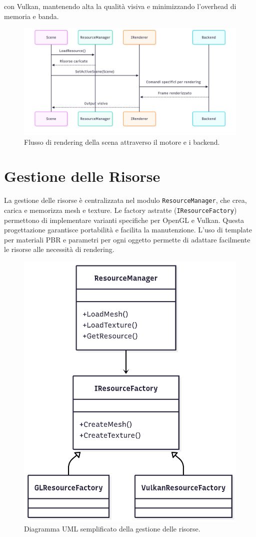 \documentclass[12pt,a4paper,openright,twoside]{book}
\begin{document}
con Vulkan, mantenendo alta la qualità visiva e minimizzando l'overhead di memoria e banda.
\begin{figure}[H]
    \centering
    \includegraphics[width=.8\linewidth]{figures/uml_activity_rendering.png}
    \caption{Flusso di rendering della scena attraverso il motore e i backend.}
    \label{fig:uml-activity-rendering}
\end{figure}

\section{Gestione delle Risorse}
La gestione delle risorse è centralizzata nel modulo \texttt{ResourceManager}, che crea, carica e memorizza mesh e
texture. Le factory astratte (\texttt{IResourceFactory}) permettono di implementare varianti specifiche per OpenGL e Vulkan.
Questa progettazione garantisce portabilità e facilita la manutenzione. L’uso di template per materiali PBR e
parametri per ogni oggetto permette di adattare facilmente le risorse alle necessità di rendering.
\begin{figure}[H]
    \centering
    \includegraphics[width=.6\linewidth]{figures/uml_resources.png}
    \caption{Diagramma UML semplificato della gestione delle risorse.}
    \label{fig:uml-resources}
\end{figure}
\end{document}
